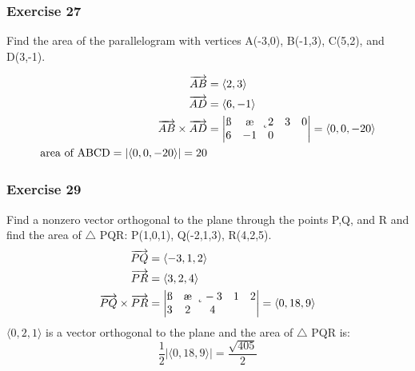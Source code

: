 \documentclass[letterpaper, 12pt]{math}
\begin{document}
\subsubsection*{Exercise 27}
Find the area of the parallelogram with vertices A(-3,0), B(-1,3), C(5,2), and
D(3,-1).
\begin{center}
\end{center}
\begin{align*}
  \overrightarrow{AB} &= \langle2,3\rangle \\
  \overrightarrow{AD} &= \langle6,-1\rangle \\
  \overrightarrow{AB}\times\overrightarrow{AD} &= \begin{vmatrix}
    \i & \j & \k \\
    2 & 3 & 0 \\
    6 & -1 & 0 \\
  \end{vmatrix} = \langle0,0,-20\rangle \\
  \text{area of ABCD} = |\langle0,0,-20\rangle| = 20
\end{align*}

\subsubsection*{Exercise 29}
Find a nonzero vector orthogonal to the plane through the points P,Q, and R and
find the area of \( \triangle \) PQR: P(1,0,1), Q(-2,1,3), R(4,2,5).
\begin{align*}
  \overrightarrow{PQ} &= \langle-3,1,2\rangle \\
  \overrightarrow{PR} &= \langle3,2,4\rangle \\
  \overrightarrow{PQ}\times\overrightarrow{PR} &= \begin{vmatrix}
    \i & \j & \k \\
    -3 & 1 & 2 \\
    3 & 2 & 4
  \end{vmatrix} = \langle0,18,9\rangle
\end{align*}
\( \langle0,2,1\rangle \) is a vector orthogonal to the plane and the area of
\( \triangle \) PQR is:
\[ \frac{1}{2}|\langle0,18,9\rangle| = \frac{\sqrt{405}}{2} \]
\end{document}
